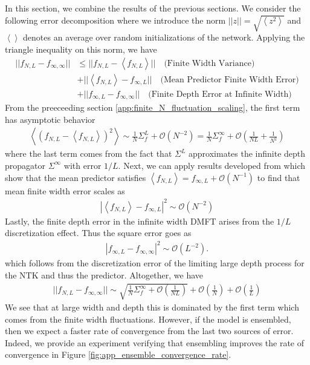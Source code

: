 \documentclass{article} %
\begin{document}
In this section, we combine the results of the previous sections. We consider the following error decomposition where we introduce the norm $|| z || = \sqrt{ \left< z^2 \right>}$ and $\left< \right>$ denotes an average over random initializations of the network. Applying the triangle inequality on this norm, we have 
\begin{align}
    || f_{N,L} - f_{\infty,\infty} || &\leq || f_{N,L} - \left< f_{N,L} \right> || \quad \text{(Finite Width Variance)} \nonumber
    \\
    &+ ||\left< f_{N,L} \right> - f_{\infty,L}|| \quad \text{(Mean Predictor Finite Width Error)} \nonumber
    \\
    &+ ||f_{\infty,L} - f_{\infty,\infty}|| \quad \text{(Finite Depth Error at Infinite Width)}
\end{align}
From the preeceeding section \ref{app:finite_N_fluctuation_scaling}, the first term has asymptotic behavior 
\begin{align}
    \left< \left( f_{N,L} - \left< f_{N,L} \right> \right)^2 \right> \sim \frac{1}{N} \Sigma_f^L + \mathcal{O}(N^{-2}) = \frac{1}{N}\Sigma_f^{\infty} + \mathcal{O}\left(\frac{1}{N L} + \frac{1}{N^2} \right) 
\end{align}
where the last term comes from the fact that $\Sigma^L$ approximates the infinite depth propagator $\Sigma^\infty$ with error $1/L$. Next, we can apply results developed from \cite{bordelon2023dynamics} which show that the mean predictor satisfies $\left< f_{N,L} \right> = f_{\infty,L} + \mathcal{O}(N^{-1})$ to find that mean finite width error scales as 
\begin{align}
     | \left< f_{N,L} \right> - f_{\infty, L} |^2 \sim \mathcal{O}(N^{-2})
\end{align}
Lastly, the finite depth error in the infinite width DMFT arises from the $1/L$ discretization effect. Thus the square error goes as 
\begin{align}
    |f_{\infty,L} - f_{\infty,\infty} |^2 \sim \mathcal{O}(L^{-2}). 
\end{align}
which follows from the discretization error of the limiting large depth process for the NTK and thus the predictor. Altogether, we have
\begin{align}
    ||f_{N,L} - f_{\infty,\infty} || \sim \sqrt{\frac{1}{N} \Sigma^\infty_f + \mathcal{O}\left( \frac{1}{NL} \right)}  + \mathcal{O}\left(\frac{1}{N} \right) + \mathcal{O}\left(\frac{1}{L} \right)
\end{align}
We see that at large width and depth this is dominated by the first term which comes from the finite width fluctuations. However, if the model is ensembled, then we expect a faster rate of convergence from the last two sources of error. Indeed, we provide an experiment verifying that ensembling improves the rate of convergence in Figure \ref{fig:app_ensemble_convergence_rate}.
\end{document}
